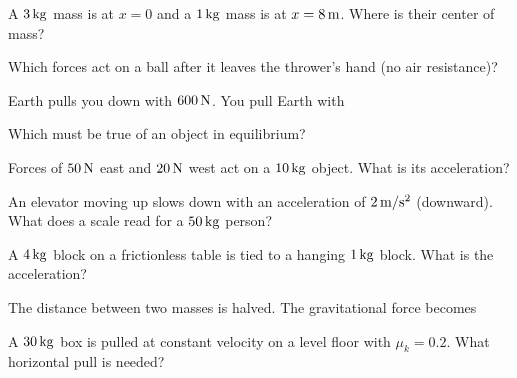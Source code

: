 \begin{exo}{}
A $3\,\mathrm{kg}$ mass is at $x=0$ and a $1\,\mathrm{kg}$ mass is at $x=8\,\mathrm{m}$. Where is their center of mass?
\end{exo}
\begin{exo}{}
Which forces act on a ball after it leaves the thrower's hand (no air resistance)?
\end{exo}
\begin{exo}{}
Earth pulls you down with $600\N$. You pull Earth with
\end{exo}
\begin{exo}{}
Which must be true of an object in equilibrium?
\end{exo}
\begin{exo}{}
Forces of $50\,\mathrm{N}$ east and $20\,\mathrm{N}$ west act on a $10\,\mathrm{kg}$ object. What is its acceleration?
\end{exo}
\begin{exo}{}
An elevator moving up slows down with an acceleration of $2\mss$ (downward). What does a scale read for a $50\,\mathrm{kg}$ person?
\choices{$400\N$}{$500\N$}{$600\N$}{$100\N$}
\end{exo}
\begin{exo}{}
A $4\,\mathrm{kg}$ block on a frictionless table is tied to a hanging $1\,\mathrm{kg}$ block. What is the acceleration?
\choices{$2.5\mss$}{$10\mss$}{$8\mss$}{$2\mss$}
\end{exo}
\begin{exo}{}
The distance between two masses is halved. The gravitational force becomes
\end{exo}
\begin{exo}{}
A $30\,\mathrm{kg}$ box is pulled at constant velocity on a level floor with $\mu_k=0.2$. What horizontal pull is needed?
\end{exo}
